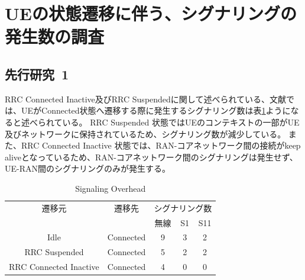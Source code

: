 \documentclass[a4j]{ujarticle}
\begin{document}
\section{UEの状態遷移に伴う、シグナリングの発生数の調査}
\subsection{先行研究~1}
RRC Connected Inactive及びRRC Suspendedに関して述べられている、文献\cite{RRCStateHandlingfor5G}では、UEがConnected状態へ遷移する際に発生するシグナリング数は表\ref{table:signalings}ようになると述べられている。
RRC Suspended 状態ではUEのコンテキストの一部がUE及びネットワークに保持されているため、シグナリング数が減少している。
また、RRC Connected Inactive 状態では、RAN-コアネットワーク間の接続がkeep aliveとなっているため、RAN-コアネットワーク間のシグナリングは発生せず、UE-RAN間のシグナリングのみが発生する。
\begin{table}[htbp]
  \centering
  \caption{Signaling Overhead}
  \label{table:signalings}
  \begin{tabular}{ccccc}
    \hline
    遷移元                  & 遷移先              & \multicolumn{3}{c}{シグナリング数} \\
                            &                     & 無線      & S1     & S11     \\ \hline \hline
    Idle                    & Connected           & 9         & 3      & 2       \\
    RRC Suspended           & Connected           & 5         & 2      & 2       \\
    RRC Connected Inactive  & Connected           & 4         & 0      & 0       \\ \hline
  \end{tabular}
\end{table}
\end{document}
